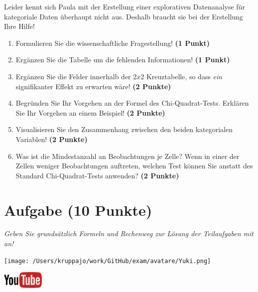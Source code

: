 \documentclass[a4paper, 9pt]{scrartcl}\usepackage[]{graphicx}\usepackage[]{xcolor}
\begin{document}
Leider kennt sich Paula mit der Erstellung einer explorativen Datenanalyse für kategoriale Daten überhaupt nicht aus. Deshalb braucht sie bei der Erstellung Ihre Hilfe!

\begin{enumerate}
  \item Formulieren Sie die wissenschaftliche Fragestellung! \textbf{(1 Punkt)}
\item Ergänzen Sie die Tabelle um die fehlenden Informationen! \textbf{(1 Punkt)} 
\item Ergänzen Sie die Felder innerhalb der $2x2$ Kreuztabelle, so dass \textit{ein} signifikanter Effekt zu erwarten wäre! \textbf{(2 Punkte)}
\item Begründen Sie Ihr Vorgehen an der Formel des Chi-Quadrat-Tests. Erklären Sie Ihr Vorgehen an einem Beispiel! \textbf{(2 Punkte)}
\item Visualisieren Sie den Zusammenhang zwischen den beiden kategorialen Variablen! \textbf{(2 Punkte)}
\item Was ist die Mindestanzahl an Beobachtungen je Zelle? Wenn in einer der Zellen weniger Beobachtungen auftreten, welchen Test können Sie anstatt des Standard Chi-Quadrat-Tests anwenden? \textbf{(2 Punkte)}
\end{enumerate} 
\clearpage

\section{Aufgabe \hfill (10 Punkte)}

\textit{Geben Sie grundsätzlich Formeln und Rechenweg zur Lösung der Teilaufgaben mit an!} \\[1Ex]
 

 
\begin{minipage}[t]{0.5\textwidth}
\texttt{[image: /Users/kruppajo/work/GitHub/exam/avatare/Yuki.png]}
\end{minipage}
\begin{minipage}[t]{0.5\textwidth}
\hfill
\href{https://youtu.be/ghArbetOr_E}{\includegraphics[width = 2cm]{img/youtube}}\\[1Ex]
\end{minipage}
\vspace{1ex}
\end{document}
